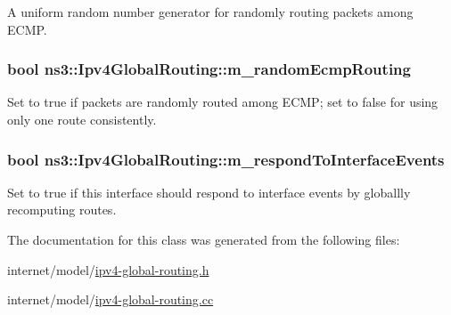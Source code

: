 A uniform random number generator for randomly routing packets among E\+C\+MP. 

\subsubsection[{\texorpdfstring{m\+\_\+random\+Ecmp\+Routing}{m_randomEcmpRouting}}]{\setlength{\rightskip}{0pt plus 5cm}bool ns3\+::\+Ipv4\+Global\+Routing\+::m\+\_\+random\+Ecmp\+Routing\hspace{0.3cm}{\ttfamily [private]}}\hypertarget{classns3_1_1Ipv4GlobalRouting_aecf81bc1f0bdbb4fff3fa7c56e4707a4}{}\label{classns3_1_1Ipv4GlobalRouting_aecf81bc1f0bdbb4fff3fa7c56e4707a4}


Set to true if packets are randomly routed among E\+C\+MP; set to false for using only one route consistently. 

\subsubsection[{\texorpdfstring{m\+\_\+respond\+To\+Interface\+Events}{m_respondToInterfaceEvents}}]{\setlength{\rightskip}{0pt plus 5cm}bool ns3\+::\+Ipv4\+Global\+Routing\+::m\+\_\+respond\+To\+Interface\+Events\hspace{0.3cm}{\ttfamily [private]}}\hypertarget{classns3_1_1Ipv4GlobalRouting_ae346dbd5b2a06c03df13c1a3987e4719}{}\label{classns3_1_1Ipv4GlobalRouting_ae346dbd5b2a06c03df13c1a3987e4719}


Set to true if this interface should respond to interface events by globallly recomputing routes. 



The documentation for this class was generated from the following files\+:\begin{DoxyCompactItemize}
\item 
internet/model/\hyperlink{ipv4-global-routing_8h}{ipv4-\/global-\/routing.\+h}\item 
internet/model/\hyperlink{ipv4-global-routing_8cc}{ipv4-\/global-\/routing.\+cc}\end{DoxyCompactItemize}
